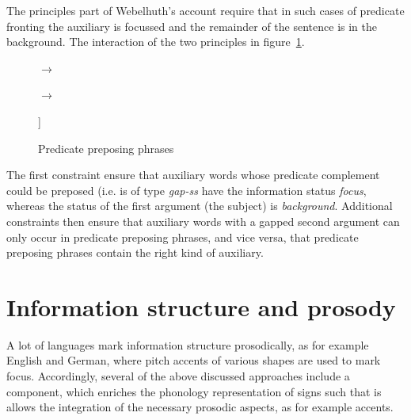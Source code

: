 \documentclass[output=paper]{langsci/langscibook}
\begin{document}
The principles part of Webelhuth's account require that in such cases
of predicate fronting the auxiliary is focussed and the remainder of
the sentence is in the background. The interaction of the two
principles in figure~\ref{fig:predicatepreposing}.
\begin{figure}[htb]
  \centering
  \begin{avm}
  \end{avm}
$\to$\ 
\begin{avm}
\end{avm}

\bigskip
\begin{avm}
$\to$\ 
\begin{avm}
  [\textit{hd-fill-ph}\\
    non-hd-dtr & [ss|status & bg]]
\end{avm}
  
\end{avm}
  \caption{Predicate preposing phrases}
  \label{fig:predicatepreposing}
\end{figure}
The first constraint ensure that auxiliary words whose predicate
complement could be preposed (i.e. is of type \textit{gap-ss} have the
information status \textit{focus}, whereas the status of the first
argument (the subject) is \textit{background}. Additional constraints
then ensure that auxiliary words with a gapped second argument can
only occur in predicate preposing phrases, and vice versa, that
predicate preposing phrases contain the right kind of auxiliary.

\section{Information structure and prosody}
\label{sec:prosody}
A lot of languages mark information structure prosodically, as for
example English and German, where pitch accents of various shapes are
used to mark focus. Accordingly, several of the above discussed
approaches include a component, which enriches the phonology representation
of signs such that is allows the integration of the necessary prosodic
aspects, as for example accents.
\end{document}
